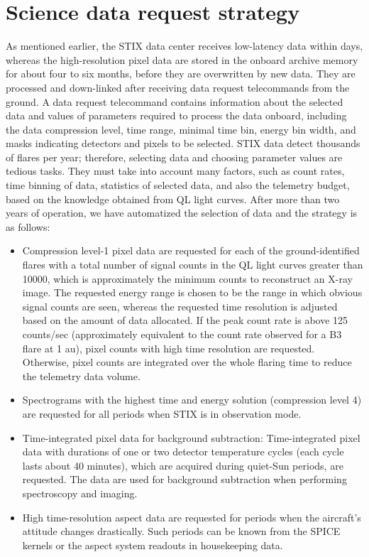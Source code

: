 \documentclass[referee]{aa} %
\begin{document}
\section{Science data request strategy}
As mentioned earlier, the STIX data center receives low-latency data within days, whereas 
the high-resolution pixel data are stored in the onboard archive memory for about four to six months, 
before they are overwritten by new data. They are processed and down-linked 
after receiving data request telecommands from the ground. 
A data request telecommand contains information about the selected data and values of parameters
required to process the data onboard, including the data compression level, 
time range, minimal time bin, energy bin width, 
and  masks indicating detectors and pixels to be selected. 
STIX data detect thousands of flares per year; therefore, 
selecting data and choosing parameter values
are tedious tasks. They must take into account many factors, 
such as count rates, time binning of data, statistics of selected data, 
and also the telemetry budget, based on the knowledge obtained from QL light curves. 
After more than two years of operation,  we have automatized the selection of data
and the strategy is as follows:
\begin{itemize}
  \item  
 Compression level-1 pixel data are requested for each of the ground-identified  flares with a total number of signal counts in the QL light curves greater than 10000, which is approximately the minimum counts to reconstruct an X-ray image. 
The requested energy range is chosen to be the range in which obvious signal counts are seen,  
whereas the requested time resolution is adjusted based on the amount of data allocated. 
If the peak count rate is above 125 counts/sec (approximately 
equivalent to the count rate observed for a B3 flare at 1 au),  pixel counts with high time resolution are requested.  Otherwise, pixel counts are integrated over the whole flaring time 
to reduce the telemetry data volume. 
 \item  Spectrograms with the highest time and energy solution (compression level 4) are requested for all periods when STIX is in observation mode. 
 \item Time-integrated pixel data for background subtraction:
Time-integrated pixel data with durations of one or two detector temperature cycles (each cycle lasts about 40 minutes), which are acquired during quiet-Sun periods, are requested. 
The data are used for background subtraction when performing spectroscopy and imaging. 
\item High time-resolution aspect data are requested for periods when the aircraft's attitude changes drastically.
Such periods can be known from the SPICE kernels or the aspect system readouts in housekeeping data. 
\end{itemize}
\end{document}
